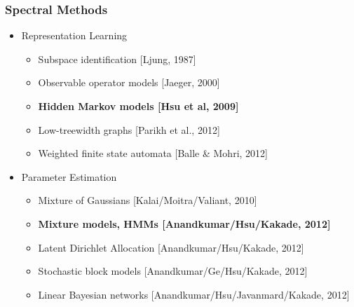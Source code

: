 \documentclass[xcolor={svgnames}]{beamer}
\begin{document}
\begin{frame}
  \frametitle{Spectral Methods}
  \begin{itemize}
     \item Representation Learning
    \begin{itemize}
    \item Subspace identification [Ljung, 1987]
    \item Observable operator models [Jaeger, 2000]
    \item {\bf Hidden Markov models [Hsu et al, 2009]}
    \item Low-treewidth graphs [Parikh et al., 2012]
    \item Weighted finite state automata [Balle \& Mohri, 2012]
  \end{itemize}
     \item<2-> Parameter Estimation
  \begin{itemize}
    \item Mixture of Gaussians [Kalai/Moitra/Valiant, 2010]
    \item {\bf Mixture models, HMMs [Anandkumar/Hsu/Kakade, 2012]}
    \item Latent Dirichlet Allocation [Anandkumar/Hsu/Kakade, 2012]
    \item Stochastic block models [Anandkumar/Ge/Hsu/Kakade, 2012]
    \item Linear Bayesian networks [Anandkumar/Hsu/Javanmard/Kakade, 2012]
  \end{itemize}
  \end{itemize}
\end{frame}
\end{document}
